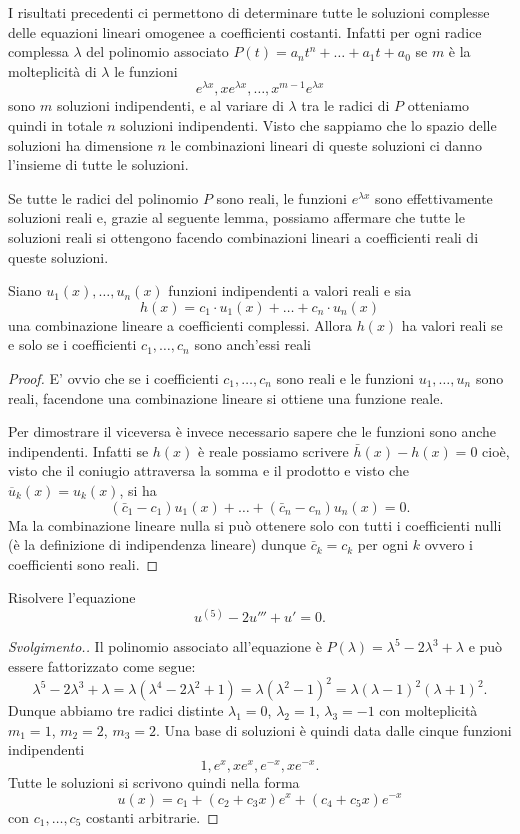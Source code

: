 I risultati precedenti ci permettono di determinare tutte le soluzioni complesse delle equazioni 
lineari omogenee a coefficienti costanti. Infatti per ogni radice complessa $\lambda$ del polinomio 
associato $P(t) = a_n t^n + \dots + a_1 t + a_0$ se $m$ è la molteplicità di $\lambda$ 
le funzioni 
\[
  e^{\lambda x}, x e^{\lambda x}, \dots, x^{m-1} e^{\lambda x}  
\]
sono $m$ soluzioni indipendenti, e al variare di $\lambda$ tra le radici di $P$ otteniamo 
quindi in totale $n$ soluzioni indipendenti. Visto che 
sappiamo che lo spazio delle soluzioni ha dimensione $n$ le combinazioni lineari di queste 
soluzioni ci danno l'insieme di tutte le soluzioni.

Se tutte le radici del polinomio $P$ sono reali, le funzioni $e^{\lambda x}$ sono effettivamente 
soluzioni reali e, grazie al seguente lemma, possiamo affermare che tutte le soluzioni reali 
si ottengono facendo combinazioni lineari a coefficienti reali di queste soluzioni.

\begin{lemma}\label{lm:combinazioni_reali}
Siano $u_1(x), \dots, u_n(x)$ funzioni indipendenti a valori reali
e sia 
\[
  h(x) = c_1 \cdot u_1(x) + \dots + c_n \cdot u_n(x)
\]
una combinazione lineare a coefficienti complessi.
Allora $h(x)$ ha valori reali se e solo se i coefficienti $c_1, \dots, c_n$ 
sono anch'essi reali
\end{lemma}
%
\begin{proof}
E' ovvio che se i coefficienti $c_1,\dots,c_n$ sono reali e le funzioni $u_1, \dots, u_n$ sono reali,
facendone una combinazione lineare si ottiene una funzione reale.

Per dimostrare il viceversa è invece necessario sapere che le funzioni sono anche indipendenti. Infatti 
se $h(x)$ è reale possiamo scrivere $\bar h(x) - h(x) = 0$ cioè, visto che il coniugio
attraversa la somma e il prodotto e visto che $\overline u_k(x) = u_k(x)$, si ha 
\[
 (\bar c_1 - c_1) u_1(x) + \dots + (\bar c_n-c_n) u_n(x)=0.
\]
Ma la combinazione lineare nulla si può ottenere solo con tutti i coefficienti nulli 
(è la definizione di indipendenza lineare) dunque $\bar c_k = c_k$ per ogni $k$ ovvero 
i coefficienti sono reali.
\end{proof}

\begin{example}
Risolvere l'equazione
\[
  u^{(5)} - 2 u''' + u' = 0.  
\]
\end{example}
%
\begin{proof}[Svolgimento.]
Il polinomio associato all'equazione è $P(\lambda) = \lambda^5 - 2\lambda^3 + \lambda$ 
e può essere fattorizzato come segue:
\[
  \lambda^5 - 2\lambda^3 + \lambda
  = \lambda(\lambda^4-2\lambda^2+1)
  = \lambda(\lambda^2-1)^2
  = \lambda(\lambda-1)^2(\lambda+1)^2.
\]
Dunque abbiamo tre radici distinte $\lambda_1=0$, $\lambda_2=1$, $\lambda_3=-1$ con molteplicità 
$m_1=1$, $m_2=2$, $m_3=2$.
Una base di soluzioni è quindi data dalle cinque funzioni indipendenti
\[
 1, e^x, xe^x, e^{-x}, xe^{-x}.
\]
Tutte le soluzioni si scrivono quindi nella forma
\[
  u(x) = c_1 + (c_2 + c_3 x)e^x + (c_4 + c_5 x) e^{-x}  
\]
con $c_1, \dots, c_5$ costanti arbitrarie.
\end{proof}

